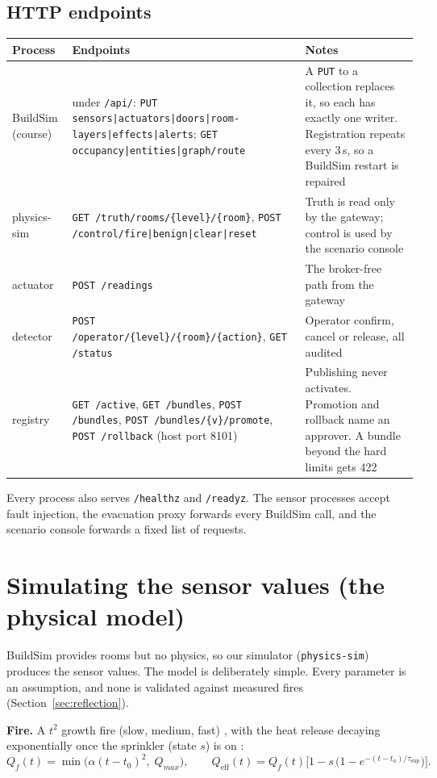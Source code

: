 \documentclass[11pt]{article}
\newcommand{\code}[1]{\texttt{#1}}
\begin{document}
\subsection{HTTP endpoints}
{\setlength{\extrarowheight}{1pt}\begin{longtable}{@{}L{2.7cm}L{7.6cm}L{5.0cm}@{}}
\toprule
Process & Endpoints & Notes\\
\midrule\endhead
BuildSim (course) & under \code{/api/}: \code{PUT sensors|actuators|doors|room-layers|effects|alerts}; \code{GET occupancy|entities|graph/route} & A \code{PUT} to a collection replaces it, so each has exactly one writer. Registration repeats every 3\,s, so a BuildSim restart is repaired\\
physics-sim & \code{GET /truth/rooms/\{level\}/\{room\}}, \code{POST /control/fire|benign|clear|reset} & Truth is read only by the gateway; control is used by the scenario console\\
actuator & \code{POST /readings} & The broker-free path from the gateway\\
detector & \code{POST /operator/\{level\}/\{room\}/\{action\}}, \code{GET /status} & Operator confirm, cancel or release, all audited\\
registry & \code{GET /active}, \code{GET /bundles}, \code{POST /bundles}, \code{POST /bundles/\{v\}/promote}, \code{POST /rollback} (host port 8101) & Publishing never activates. Promotion and rollback name an approver. A bundle beyond the hard limits gets 422\\
\bottomrule
\end{longtable}}
Every process also serves \code{/healthz} and \code{/readyz}. The sensor processes accept fault injection, the evacuation proxy forwards every BuildSim call, and the scenario console forwards a fixed list of requests.

\section{Simulating the sensor values (the physical model)}\label{sec:physics}

BuildSim provides rooms but no physics, so our simulator (\code{physics-sim}) produces the sensor values. The model is deliberately simple. Every parameter is an assumption, and none is validated against measured fires (Section~\ref{sec:reflection}).

\textbf{Fire.} A $t^2$ growth fire (slow, medium, fast) \cite{heskestad,cfast}, with the heat release decaying exponentially once the sprinkler (state $s$) is on \cite{evans}:
\begin{equation}
Q_f(t)=\min\!\big(\alpha(t-t_0)^2,\;Q_{max}\big),\qquad
Q_{\mathrm{eff}}(t)=Q_f(t)\Big[1-s\,\big(1-e^{-(t-t_a)/\tau_{\mathrm{sup}}}\big)\Big].
\end{equation}
\end{document}
